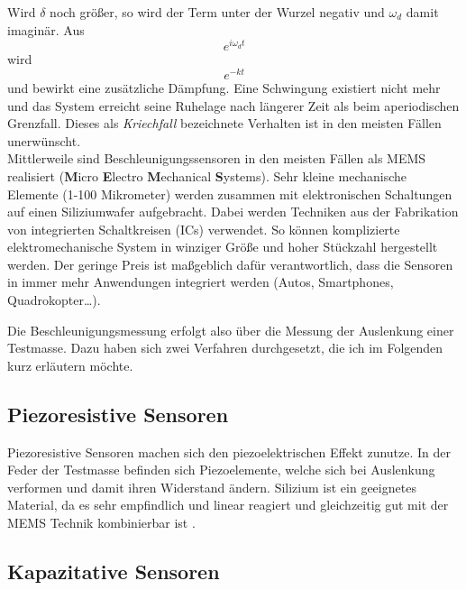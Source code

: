 \documentclass[12pt,a4paper]{scrartcl}
\begin{document}
Wird $\delta$ noch größer, so wird der Term unter der Wurzel negativ und $\omega_d$ damit imaginär. Aus 
\begin{equation}
e^{i\omega_d t}
\end{equation}
wird
\begin{equation}
e^{-k t}
\end{equation}
und bewirkt eine zusätzliche Dämpfung. Eine Schwingung existiert nicht mehr und das System erreicht seine Ruhelage nach längerer Zeit als beim aperiodischen Grenzfall. Dieses als \textit{Kriechfall} bezeichnete Verhalten ist in den meisten Fällen unerwünscht. \\



Mittlerweile sind Beschleunigungssensoren in den meisten Fällen als MEMS realisiert (\textbf{M}icro \textbf{E}lectro \textbf{M}echanical \textbf{S}ystems). Sehr kleine mechanische Elemente (1-100 Mikrometer) werden zusammen mit elektronischen Schaltungen auf einen Siliziumwafer aufgebracht. Dabei werden Techniken aus der Fabrikation von integrierten Schaltkreisen (ICs) verwendet. So können komplizierte elektromechanische System in winziger Größe und hoher Stückzahl hergestellt werden. Der geringe Preis ist maßgeblich dafür verantwortlich, dass die Sensoren in immer mehr Anwendungen integriert werden (Autos, Smartphones, Quadrokopter…).

Die Beschleunigungsmessung erfolgt also über die Messung der Auslenkung einer Testmasse. Dazu haben sich zwei Verfahren durchgesetzt, die ich im Folgenden kurz erläutern möchte. 

\subsection{Piezoresistive Sensoren}
Piezoresistive Sensoren machen sich den piezoelektrischen Effekt zunutze. In der Feder der Testmasse befinden sich Piezoelemente, welche sich bei Auslenkung verformen und damit ihren Widerstand ändern. Silizium ist ein geeignetes Material, da es sehr empfindlich und linear reagiert und gleichzeitig gut mit der MEMS Technik kombinierbar ist \citep{Kanda:1991gf}.

\subsection{Kapazitative Sensoren}
\end{document}
